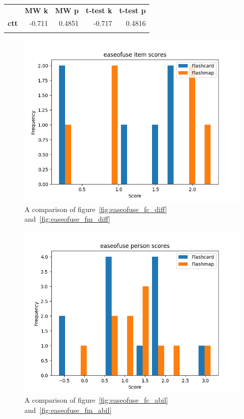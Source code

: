 \begin{longtable}[c]{@{}lrrrr@{}}
\toprule\addlinespace
& \textbf{MW k} & \textbf{MW p} &
\textbf{t-test k} & \textbf{t-test p}
\\\addlinespace
\midrule
\textbf{ctt} & -0.711 & 0.4851 & -0.717 & 0.4816
\\\addlinespace
\bottomrule
    \label{tab:easeofuse_comp}
\end{longtable}

\begin{figure}
    \centering
    \includegraphics[width=.7\textwidth]{img/easeofuse_diff.png}
    \caption{A comparison of figure~\protect\ref{fig:easeofuse_fc_diff} and~\protect\ref{fig:easeofuse_fm_diff}}
    \label{fig:easeofuse_diff}
\end{figure}
\begin{figure}
    \centering
    \includegraphics[width=.7\textwidth]{img/easeofuse_abil.png}
    \caption{A comparison of figure~\protect\ref{fig:easeofuse_fc_abil} and~\protect\ref{fig:easeofuse_fm_abil}}
    \label{fig:easeofuse_abil}
\end{figure}
